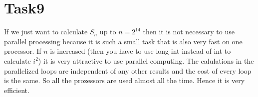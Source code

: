 \documentclass[11pt,titlepage] {article}
\begin{document}
\section{Task9}
If we just want to calculate $S_n$ up to $n=2^{14}$ then it is not necessary to use parallel processing because it is such a small task that is also very fast on one processor. If $n$ is increased (then you have to use long int instead of int to calculate $i^2$) it is very attractive to use parallel computing. The calulations in the parallelized loops are independent of any other results and the cost of every loop is the same. So all the prozessors are used almost all the time. Hence it is very efficient. 
\end{document}
